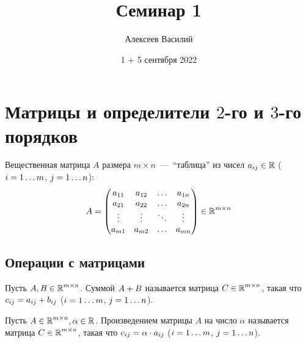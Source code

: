 \documentclass[a4paper,12pt]{article}
\author{Алексеев Василий}
\title{Семинар 1}
\date{1 + 5 сентября 2022}
\begin{document}
  \maketitle
  
  \tableofcontents

  \thispagestyle{empty}
  
  \newpage
  


  \section{Матрицы и определители $2$-го и $3$-го порядков}

  Вещественная матрица $A$ размера $m \times n$~---~``таблица'' из чисел $a_{ij} \hm\in \RR$ ($i \hm= 1 \ldots m$, $j \hm= 1 \ldots n$):
  \[
    A = \begin{pmatrix}
      a_{11} & a_{12} & \ldots & a_{1n}\\
      a_{21} & a_{22} & \ldots & a_{2n}\\
      \vdots & \vdots & \ddots & \vdots\\
      a_{m1} & a_{m2} & \ldots & a_{mn}
    \end{pmatrix} \in \operatorname{\mathbb R}^{m \times n}
  \]
  
  
  \subsection{Операции с матрицами}
  
  \begin{definition}
    Пусть $A, B \in \operatorname{\mathbb R}^{m \times n}$.
    Суммой $A \hm+ B$ называется матрица $C \hm\in \RR^{m \times n}$, такая что
    $c_{ij} \hm= a_{ij} + b_{ij}$ ($i \hm= 1 \ldots m$, $j \hm= 1 \ldots n$).
  \end{definition}
  
  \begin{definition}
    Пусть $A \in \operatorname{\mathbb R}^{m \times n}, \alpha \in \operatorname{\mathbb R}$.
    Произведением матрицы $A$ на число $\alpha$ называется матрица $C \hm\in \RR^{m \times n}$, такая что
    $c_{ij} \hm= \alpha \cdot a_{ij}$ ($i \hm= 1 \ldots m$, $j \hm= 1 \ldots n$).
  \end{definition}
  
\end{document}
